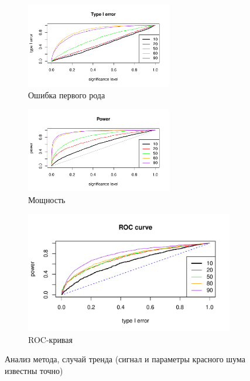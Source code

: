 \documentclass[specialist,
substylefile = spbu_report.rtx,
subf,href,colorlinks=true, 12pt]{disser}
\theoremstyle{definition}
\begin{document}
\begin{figure}[h]
	\captionsetup[subfigure]{justification=Centering}
	\begin{subfigure}[t]{\textwidth}
		\centering
		\includegraphics[width=0.7\textwidth]{img/type1error_trend.pdf}
		\caption{Ошибка первого рода}
		\label{fig:trend_type1error}
	\end{subfigure}
	\begin{subfigure}[t]{\textwidth}
		\centering
		\includegraphics[width=0.7\textwidth]{img/power_trend.pdf}
		\caption{Мощность}
		\label{fig:trend_power}
	\end{subfigure}
	\begin{subfigure}[t]{\textwidth}
		\centering
		\includegraphics[width=0.7\linewidth]{img/roc_trend.pdf}
		\caption{ROC-кривая}
		\label{fig:trend_roc}
	\end{subfigure}
	\caption{Анализ метода, случай тренда (сигнал и параметры красного шума известны точно)}
	\label{fig:trend}
\end{figure}
\end{document}
